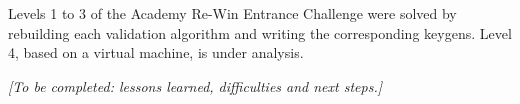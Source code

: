 Levels 1 to 3 of the Academy Re-Win Entrance Challenge were solved by rebuilding each validation algorithm and writing the corresponding keygens. Level 4, based on a virtual machine, is under analysis.

\textit{[To be completed: lessons learned, difficulties and next steps.]}
